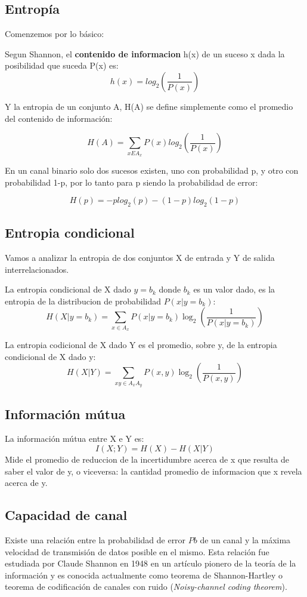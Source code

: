 \subsection{Entropía}

Comenzemos por lo básico:

Segun Shannon, el \textbf{contenido de informacion} h(x) de un suceso x dada la posibilidad que suceda P(x) es:
$$ h(x) = log_{2}\left(\frac{1}{P(x)}\right) $$

Y la entropia de un conjunto A, H(A) se define simplemente como el promedio del contenido de información:

$$ H(A) = \sum_{x E A_{x}} P(x)log_{2}\left(\frac{1}{P(x)}\right)$$

En un canal binario solo dos sucesos existen, uno con probabilidad p, y otro con probabilidad 1-p, por lo tanto para p siendo la probabilidad de error:

$$ H(p) = -p log_{2}(p)-(1-p)log_{2}(1-p) $$

\subsection{Entropia condicional}

Vamos a analizar la entropia de dos conjuntos X de entrada y Y de salida interrelacionados.

La entropia condicional de X dado $y=b_k$ donde $b_k$ es un valor dado, es la entropia de la distribucion de probabilidad $P(x|y=b_{k})$:
$$H(X|y=b_{k}) = \sum_{x \in A_{x}} P(x | y=b_{k})\log_2\left(\frac{1}{P(x | y=b_{k})}\right) $$

La entropia codicional de X dado Y es el promedio, sobre y, de la entropia condicional de X dado y:
$$H(X|Y) =  \sum_{xy \in A_{x}A_{y}} P(x,y)\log_2\left(\frac{1}{P(x,y)}\right) $$

\subsection{Información mútua}
La información mútua entre X e Y es:
$$I(X;Y) = H(X)-H(X|Y)$$
Mide el promedio de reduccion de la incertidumbre acerca de x que resulta de saber el valor de y, o viceversa: la cantidad promedio de informacion que x revela acerca de y.

\fi
\subsection{Capacidad de canal}

Existe una relación entre la probabilidad de error $Pb$ de un canal y la máxima velocidad de transmisión de datos posible en el mismo.
Esta relación fue estudiada por Claude Shannon en 1948 en un artículo pionero de la teoría de la información \cite{shannon48} y es conocida actualmente como teorema de Shannon-Hartley o teorema de codificación de canales con ruido (\textit{Noisy-channel coding theorem}).

